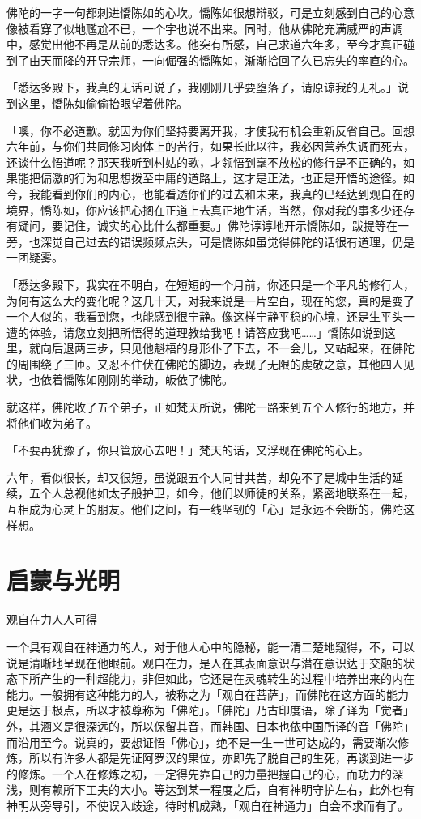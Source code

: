 \documentclass[12pt,twoside,openany]{book}
\begin{document}
佛陀的一字一句都刺进憍陈如的心坎。憍陈如很想辩驳，可是立刻感到自己的心意像被看穿了似地尶尬不已，一个字也说不出来。同时，他从佛陀充满威严的声调中，感觉出他不再是从前的悉达多。他突有所感，自己求道六年多，至今才真正碰到了由天而降的开导宗师，一向倔强的憍陈如，渐渐拾回了久已忘失的率直的心。

「悉达多殿下，我真的无话可说了，我刚刚几乎要堕落了，请原谅我的无礼。」说到这里，憍陈如偷偷抬眼望着佛陀。

「噢，你不必道歉。就因为你们坚持要离开我，才使我有机会重新反省自己。回想六年前，与你们共同修习肉体上的苦行，如果长此以往，我必因营养失调而死去，还谈什么悟道呢？那天我听到村姑的歌，才领悟到毫不放松的修行是不正确的，如果能把偏激的行为和思想拨至中庸的道路上，这才是正法，也正是开悟的途径。如今，我能看到你们的内心，也能看透你们的过去和未来，我真的已经达到观自在的境界，憍陈如，你应该把心搁在正道上去真正地生活，当然，你对我的事多少还存有疑问，要记住，诚实的心比什么都重要。」佛陀谆谆地开示憍陈如，跋提等在一旁，也深觉自己过去的错误频频点头，可是憍陈如虽觉得佛陀的话很有道理，仍是一团疑雾。

「悉达多殿下，我实在不明白，在短短的一个月前，你还只是一个平凡的修行人，为何有这么大的变化呢？这几十天，对我来说是一片空白，现在的您，真的是变了一个人似的，我看到您，也能感到很宁静。像这样宁静平稳的心境，还是生平头一遭的体验，请您立刻把所悟得的道理教给我吧！请答应我吧……」憍陈如说到这里，就向后退两三步，只见他魁梧的身形仆了下去，不一会儿，又站起来，在佛陀的周围绕了三匝。又忍不住伏在佛陀的脚边，表现了无限的虔敬之意，其他四人见状，也依着憍陈如刚刚的举动，皈依了怫陀。

就这样，佛陀收了五个弟子，正如梵天所说，佛陀一路来到五个人修行的地方，并将他们收为弟子。

「不要再犹豫了，你只管放心去吧！」梵天的话，又浮现在佛陀的心上。

六年，看似很长，却又很短，虽说跟五个人同甘共苦，却免不了是城中生活的延续，五个人总视他如太子般护卫，如今，他们以师徒的关系，紧密地联系在一起，互相成为心灵上的朋友。他们之间，有一线坚韧的「心」是永远不会断的，佛陀这样想。

\section{启蒙与光明}\label{sec2.5}

观自在力人人可得

一个具有观自在神通力的人，对于他人心中的隐秘，能一清二楚地窥得，不，可以说是清晰地呈现在他眼前。观自在力，是人在其表面意识与潜在意识达于交融的状态下所产生的一种超能力，非但如此，它还是在灵魂转生的过程中培养出来的内在能力。一般拥有这种能力的人，被称之为「观自在菩萨」，而佛陀在这方面的能力更是达于极点，所以才被尊称为「佛陀」。「佛陀」乃古印度语，除了译为「觉者」外，其涵义是很深远的，所以保留其音，而韩国、日本也依中国所译的音「佛陀」而沿用至今。说真的，要想证悟「佛心」，绝不是一生一世可达成的，需要渐次修炼，所以有许多人都是先证阿罗汉的果位，亦即先了脱自己的生死，再谈到进一步的修炼。一个人在修炼之初，一定得先靠自己的力量把握自己的心，而功力的深浅，则有赖所下工夫的大小。等达到某一程度之后，自有神明守护左右，此外也有神明从旁导引，不使误入歧途，待时机成熟，「观自在神通力」自会不求而有了。
\end{document}
